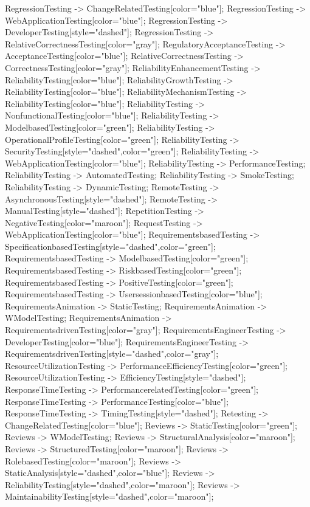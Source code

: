 \documentclass{article}
\begin{document}
{RegressionTesting -> ChangeRelatedTesting[color="blue"];
RegressionTesting -> WebApplicationTesting[color="blue"];
RegressionTesting -> DeveloperTesting[style="dashed"];
RegressionTesting -> RelativeCorrectnessTesting[color="gray"];
RegulatoryAcceptanceTesting -> AcceptanceTesting[color="blue"];
RelativeCorrectnessTesting -> CorrectnessTesting[color="gray"];
ReliabilityEnhancementTesting -> ReliabilityTesting[color="blue"];
ReliabilityGrowthTesting -> ReliabilityTesting[color="blue"];
ReliabilityMechanismTesting -> ReliabilityTesting[color="blue"];
ReliabilityTesting -> NonfunctionalTesting[color="blue"];
ReliabilityTesting -> ModelbasedTesting[color="green"];
ReliabilityTesting -> OperationalProfileTesting[color="green"];
ReliabilityTesting -> SecurityTesting[style="dashed",color="green"];
ReliabilityTesting -> WebApplicationTesting[color="blue"];
ReliabilityTesting -> PerformanceTesting;
ReliabilityTesting -> AutomatedTesting;
ReliabilityTesting -> SmokeTesting;
ReliabilityTesting -> DynamicTesting;
RemoteTesting -> AsynchronousTesting[style="dashed"];
RemoteTesting -> ManualTesting[style="dashed"];
RepetitionTesting -> NegativeTesting[color="maroon"];
RequestTesting -> WebApplicationTesting[color="blue"];
RequirementsbasedTesting -> SpecificationbasedTesting[style="dashed",color="green"];
RequirementsbasedTesting -> ModelbasedTesting[color="green"];
RequirementsbasedTesting -> RiskbasedTesting[color="green"];
RequirementsbasedTesting -> PositiveTesting[color="green"];
RequirementsbasedTesting -> UsersessionbasedTesting[color="blue"];
RequirementsAnimation -> StaticTesting;
RequirementsAnimation -> WModelTesting;
RequirementsAnimation -> RequirementsdrivenTesting[color="gray"];
RequirementsEngineerTesting -> DeveloperTesting[color="blue"];
RequirementsEngineerTesting -> RequirementsdrivenTesting[style="dashed",color="gray"];
ResourceUtilizationTesting -> PerformanceEfficiencyTesting[color="green"];
ResourceUtilizationTesting -> EfficiencyTesting[style="dashed"];
ResponseTimeTesting -> PerformancerelatedTesting[color="green"];
ResponseTimeTesting -> PerformanceTesting[color="blue"];
ResponseTimeTesting -> TimingTesting[style="dashed"];
Retesting -> ChangeRelatedTesting[color="blue"];
Reviews -> StaticTesting[color="green"];
Reviews -> WModelTesting;
Reviews -> StructuralAnalysis[color="maroon"];
Reviews -> StructuredTesting[color="maroon"];
Reviews -> RolebasedTesting[color="maroon"];
Reviews -> StaticAnalysis[style="dashed",color="blue"];
Reviews -> ReliabilityTesting[style="dashed",color="maroon"];
Reviews -> MaintainabilityTesting[style="dashed",color="maroon"];
}
\end{document}
